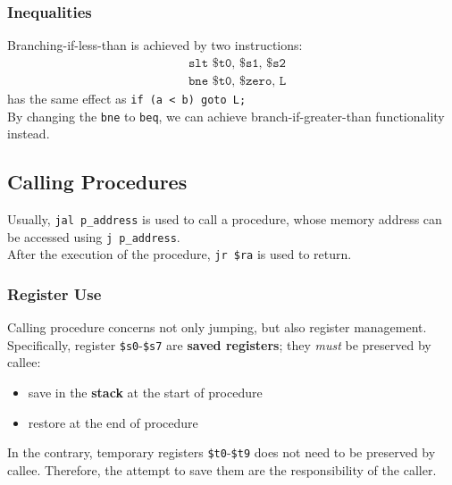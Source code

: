 \documentclass[12pt]{article}
\theoremstyle{definition}
\begin{document}
\subsubsection{Inequalities}
Branching-if-less-than is achieved by two instructions:
\begin{align*}
&\texttt{slt \$t0, \$s1, \$s2}\\
&\texttt{bne \$t0, \$zero, L} 
\end{align*}
has the same effect as \texttt{if (a < b) goto L;}\\
By changing the \texttt{bne} to \texttt{beq}, we can achieve branch-if-greater-than functionality instead.
\subsection{Calling Procedures}
Usually, \texttt{jal p\_address} is used to call a procedure, whose memory address can be accessed using \texttt{j p\_address}.\\
After the execution of the procedure, \texttt{jr \$ra} is used to return. 
\subsubsection{Register Use}
Calling procedure concerns not only jumping, but also register management. Specifically, register \texttt{\$s0}-\texttt{\$s7} are \textbf{saved registers}; they \textit{must} be preserved by callee:
\begin{itemize}
  \item save in the \textbf{stack} at the start of procedure
  \item restore at the end of procedure
\end{itemize}
In the contrary, temporary registers \texttt{\$t0}-\texttt{\$t9} does not need to be preserved by callee. Therefore, the attempt to save them are the responsibility of the caller.
\end{document}
